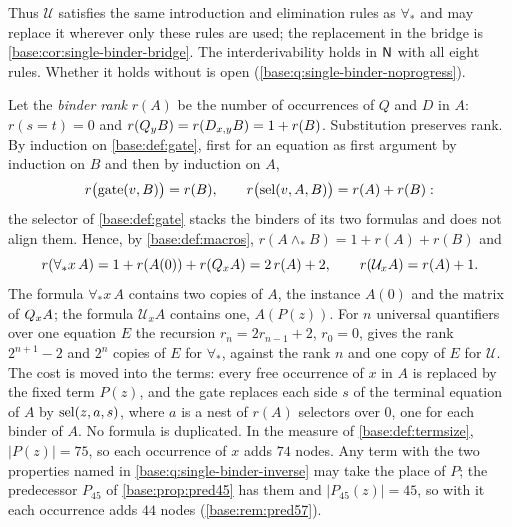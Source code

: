 Thus $\mathcal U$ satisfies the same introduction and elimination rules as
$\forall_*$ and may replace it wherever only these rules are used; the
replacement in the bridge is \cref{base:cor:single-binder-bridge}.  The
interderivability holds in $\mathsf{N}$ with all eight rules.  Whether it holds
without  is open (\cref{base:q:single-binder-noprogress}).

\begin{remark}
\label{base:rem:single-binder-size}
Let the \emph{binder rank} $r(A)$ be the number of occurrences of $Q$ and
$D$ in $A$: $r(s=t)=0$ and $r(Q_{y}B)=r(D_{x,y}B)=1+r(B)$.  Substitution
preserves rank.  By induction on \cref{base:def:gate}, first for an
equation as first argument by induction on $B$ and then by induction on
$A$,
\[
 r\bigl(\operatorname{gate}(v,B)\bigr)=r(B),\qquad
 r\bigl(\operatorname{sel}(v,A,B)\bigr)=r(A)+r(B):
\]
the selector of \cref{base:def:gate} stacks the binders of its two formulas
and does not align them.  Hence, by \cref{base:def:macros},
$r(A\wedge_* B)=1+r(A)+r(B)$ and
\[
 r(\forall_* x\,A)=1+r(A(0))+r(Q_{x}A)=2\,r(A)+2,\qquad
 r(\mathcal U_xA)=r(A)+1 .
\]
The formula $\forall_* x\,A$ contains two copies of $A$, the instance $A(0)$
and the matrix of $Q_{x}A$; the formula $\mathcal U_xA$ contains one,
$A(P(z))$.  For $n$ universal quantifiers over one equation $E$ the
recursion $r_n=2r_{n-1}+2$, $r_0=0$, gives the rank $2^{n+1}-2$ and $2^n$
copies of $E$ for $\forall_*$, against the rank $n$ and one copy of $E$
for $\mathcal U$.  The cost is moved into the terms: every free occurrence
of $x$ in $A$ is replaced by the fixed term $P(z)$, and the gate replaces
each side $s$ of the terminal equation of $A$ by $\operatorname{sel}(z,a,s)$, where $a$
is a nest of $r(A)$ selectors over $0$, one for each binder of $A$.  No
formula is duplicated.  In the measure of \cref{base:def:termsize},
$|P(z)|=75$, so each occurrence of $x$ adds $74$ nodes.  Any term with the
two properties named in \cref{base:q:single-binder-inverse} may take the
place of $P$; the predecessor $P_{45}$ of \cref{base:prop:pred45} has them and
$|P_{45}(z)|=45$, so with it each occurrence adds $44$ nodes
(\cref{base:rem:pred57}).
\end{remark}


